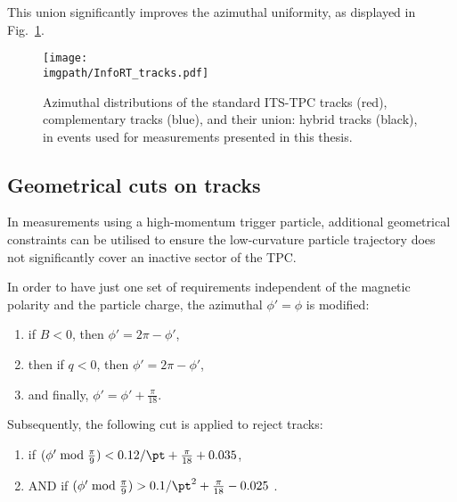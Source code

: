 This union significantly improves the azimuthal uniformity, as displayed in Fig.~\ref{fig:tracks:hybrid}.

\begin{figure}%
\texttt{[image: \\imgpath/InfoRT\_tracks.pdf]}\\
\caption{Azimuthal distributions of the standard ITS-TPC tracks (red), complementary tracks (blue), and their union: hybrid tracks (black), in events used for measurements presented in this thesis. }
\label{fig:tracks:hybrid}
\end{figure}

\subsection{Geometrical cuts on tracks}

In measurements using a high-momentum trigger particle, additional geometrical constraints can be utilised to ensure the low-curvature particle trajectory does not significantly cover an inactive sector of the TPC.

In order to have just one set of requirements independent of the magnetic polarity and the particle charge, the azimuthal $\phi' = \phi$ is modified:
\begin{enumerate}
\item if $B<0$, then $\phi' = 2\pi - \phi'$,
\item then if $q<0$, then $\phi' = 2\pi - \phi'$,
\item and finally, $\phi' = \phi' + \frac{\pi}{18}$.
\end{enumerate}

Subsequently, the following cut is applied to reject tracks:
\begin{enumerate}
\item if $(\phi' \bmod \frac{\pi}{9}) < 0.12 / \pt + \frac{\pi}{18} + 0.035$,
\item AND if $(\phi' \bmod \frac{\pi}{9}) > 0.1 / \pt^2 + \frac{\pi}{18} - 0.025$ .
\end{enumerate}


